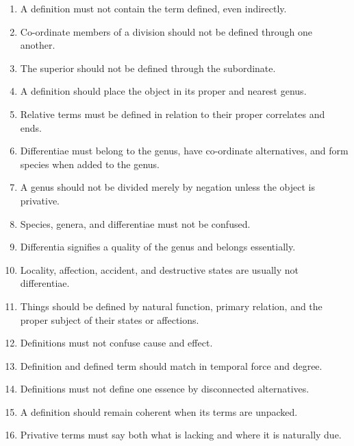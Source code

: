 \documentclass[12pt]{article}
\begin{document}
\begin{enumerate}[itemsep=0.5em]
    \item A definition must not contain the term defined, even indirectly.

    \item Co-ordinate members of a division should not be defined through one
    another.

    \item The superior should not be defined through the subordinate.

    \item A definition should place the object in its proper and nearest genus.

    \item Relative terms must be defined in relation to their proper correlates
    and ends.

    \item Differentiae must belong to the genus, have co-ordinate alternatives,
    and form species when added to the genus.

    \item A genus should not be divided merely by negation unless the object is
    privative.

    \item Species, genera, and differentiae must not be confused.

    \item Differentia signifies a quality of the genus and belongs essentially.

    \item Locality, affection, accident, and destructive states are usually not
    differentiae.

    \item Things should be defined by natural function, primary relation, and the
    proper subject of their states or affections.

    \item Definitions must not confuse cause and effect.

    \item Definition and defined term should match in temporal force and degree.

    \item Definitions must not define one essence by disconnected alternatives.

    \item A definition should remain coherent when its terms are unpacked.

    \item Privative terms must say both what is lacking and where it is naturally
    due.


\end{enumerate}
\end{document}
